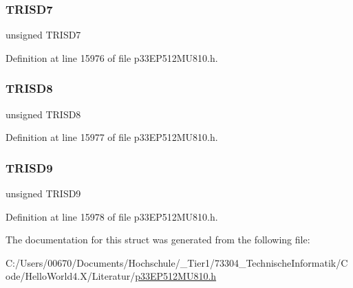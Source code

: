 \subsubsection{\texorpdfstring{T\+R\+I\+S\+D7}{TRISD7}}
{\footnotesize\ttfamily unsigned T\+R\+I\+S\+D7}



Definition at line 15976 of file p33\+E\+P512\+M\+U810.\+h.

\mbox{\label{structtag_t_r_i_s_d_b_i_t_s_a47b82d9099468a966f455fc4dc99dc0a}} 
\subsubsection{\texorpdfstring{T\+R\+I\+S\+D8}{TRISD8}}
{\footnotesize\ttfamily unsigned T\+R\+I\+S\+D8}



Definition at line 15977 of file p33\+E\+P512\+M\+U810.\+h.

\mbox{\label{structtag_t_r_i_s_d_b_i_t_s_a8913bc20c7f3b24d7a3aedb3565d4b4b}} 
\subsubsection{\texorpdfstring{T\+R\+I\+S\+D9}{TRISD9}}
{\footnotesize\ttfamily unsigned T\+R\+I\+S\+D9}



Definition at line 15978 of file p33\+E\+P512\+M\+U810.\+h.



The documentation for this struct was generated from the following file\+:\begin{DoxyCompactItemize}
\item 
C\+:/\+Users/00670/\+Documents/\+Hochschule/\+\_\+\+Tier1/73304\+\_\+\+Technische\+Informatik/\+Code/\+Hello\+World4.\+X/\+Literatur/\hyperlink{p33_e_p512_m_u810_8h}{p33\+E\+P512\+M\+U810.\+h}\end{DoxyCompactItemize}
